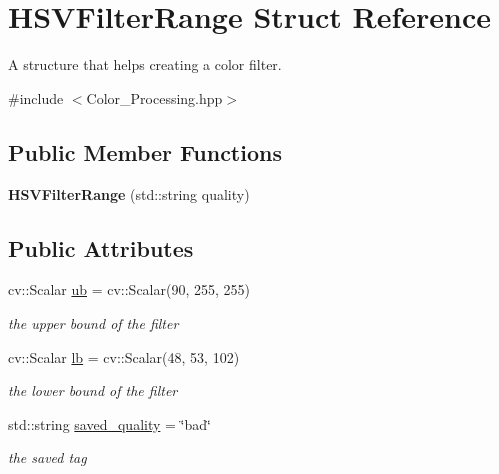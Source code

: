 \hypertarget{struct_h_s_v_filter_range}{}\section{H\+S\+V\+Filter\+Range Struct Reference}
\label{struct_h_s_v_filter_range}


A structure that helps creating a color filter.  




{\ttfamily \#include $<$Color\+\_\+\+Processing.\+hpp$>$}

\subsection*{Public Member Functions}
\begin{DoxyCompactItemize}
\item 
\mbox{\label{struct_h_s_v_filter_range_a4e37551e92211618e217752f0056847a}} 
{\bfseries H\+S\+V\+Filter\+Range} (std\+::string quality)
\end{DoxyCompactItemize}
\subsection*{Public Attributes}
\begin{DoxyCompactItemize}
\item 
\mbox{\label{struct_h_s_v_filter_range_a1c5b705f9992e014fd4dd7085e078c9d}} 
cv\+::\+Scalar \mbox{\hyperlink{struct_h_s_v_filter_range_a1c5b705f9992e014fd4dd7085e078c9d}{ub}} = cv\+::\+Scalar(90, 255, 255)
\begin{DoxyCompactList}\small\item\em the upper bound of the filter \end{DoxyCompactList}\item 
\mbox{\label{struct_h_s_v_filter_range_a0c5c2a10fb591c4dd1512ae81e1032a4}} 
cv\+::\+Scalar \mbox{\hyperlink{struct_h_s_v_filter_range_a0c5c2a10fb591c4dd1512ae81e1032a4}{lb}} = cv\+::\+Scalar(48, 53, 102)
\begin{DoxyCompactList}\small\item\em the lower bound of the filter \end{DoxyCompactList}\item 
\mbox{\label{struct_h_s_v_filter_range_a5ded3fde3f4b37d5e0de6f40fd508271}} 
std\+::string \mbox{\hyperlink{struct_h_s_v_filter_range_a5ded3fde3f4b37d5e0de6f40fd508271}{saved\+\_\+quality}} = \char`\"{}bad\char`\"{}
\begin{DoxyCompactList}\small\item\em the saved tag \end{DoxyCompactList}\end{DoxyCompactItemize}


